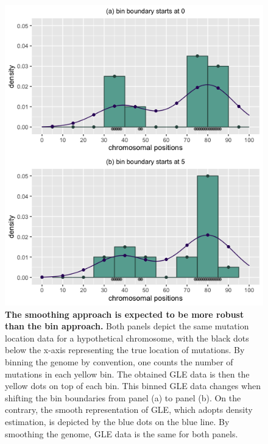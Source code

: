 \begin{figure}[h!]
  \begin{minipage}[c]{0.48\textwidth}
    \caption{
      \textbf{The smoothing approach is expected to be more robust than the bin approach.} Both panels depict the same mutation location data for a hypothetical chromosome, with the black dots below the x-axis representing the true location of mutations. By binning the genome by convention, one counts the number of mutations in each yellow bin. The obtained GLE data is then the yellow dots on top of each bin. This binned GLE data changes when shifting the bin boundaries from panel (a) to panel (b). On the contrary, the smooth representation of GLE, which adopts \gls{density} estimation, is depicted by the blue dots on the blue line. By smoothing the genome, GLE data is the same for both panels. 
    } \label{fig:mutdistribution_demo}
  \end{minipage}\hfill
  \begin{minipage}[c]{0.55\textwidth}
    \includegraphics[width=\textwidth]{graphics/mutdistribution_demo.png}
  \end{minipage}
\end{figure}
